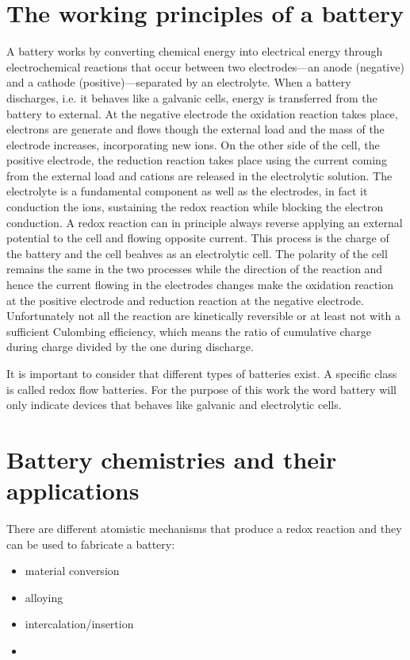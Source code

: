 \section{The working principles of a battery}
A battery works by converting chemical energy into electrical energy through electrochemical reactions that occur between two electrodes—an anode (negative) and a cathode (positive)—separated by an electrolyte.  When a battery discharges, i.e. it behaves like a galvanic cells, energy is transferred from the battery to external. At the negative electrode the oxidation reaction takes place, electrons are generate and flows though the external load and the mass of the electrode increases, incorporating new ions. On the other side of the cell, the positive electrode, the reduction reaction takes place using the current coming from the external load and cations are released in the electrolytic solution. The electrolyte is a fundamental component as well as the electrodes, in fact it conduction the ions, sustaining the redox reaction while blocking the electron conduction. A redox reaction can in principle always reverse applying an external potential to the cell and flowing opposite current. This process is the charge of the battery and the cell beahves as an electrolytic cell. The polarity of the cell remains the same in the two processes while the direction of the reaction and hence the current flowing in the electrodes changes make the oxidation reaction at the positive electrode and reduction reaction at the negative electrode. Unfortunately not all the reaction are kinetically reversible or at least not with a sufficient Culombing efficiency, which means the ratio of cumulative charge during charge divided by the one during discharge. 

It is important to consider that different types of batteries exist. A specific class is called redox flow batteries. 
For the purpose of this work the word battery will only indicate devices that behaves like galvanic and electrolytic cells.

\section{Battery chemistries and their applications}
There are different atomistic mechanisms that produce a redox reaction and they can be used to fabricate a battery:
\begin{itemize}
    \item material conversion
    \item alloying
    \item intercalation/insertion
    \item 
\end{itemize}

